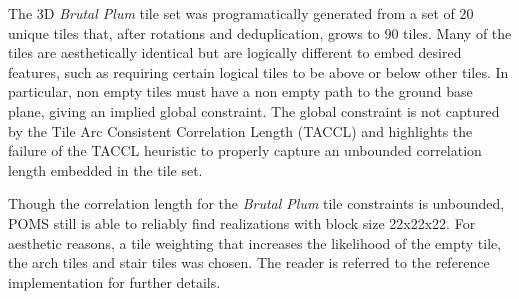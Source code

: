 
The 3D \textit{Brutal Plum} tile set was programatically generated from a set of 20 unique tiles that, after rotations and deduplication,
grows to 90 tiles.
Many of the tiles are aesthetically identical but are logically different to embed desired features, such as requiring certain
logical tiles to be above or below other tiles. %
In particular, non empty tiles must have a non empty path to the ground base plane, giving an implied global constraint.
The global constraint is not captured by the Tile Arc Consistent Correlation Length (TACCL) and highlights
the failure of the TACCL heuristic to properly capture an unbounded correlation length embedded in the tile set.


Though the correlation length for the \textit{Brutal Plum} tile constraints is unbounded, POMS still is able to reliably find realizations with
block size 22x22x22.
For aesthetic reasons, a tile weighting that increases the likelihood of the empty tile, the arch tiles and
stair tiles was chosen.
The reader is referred to the reference implementation 
for further details.


